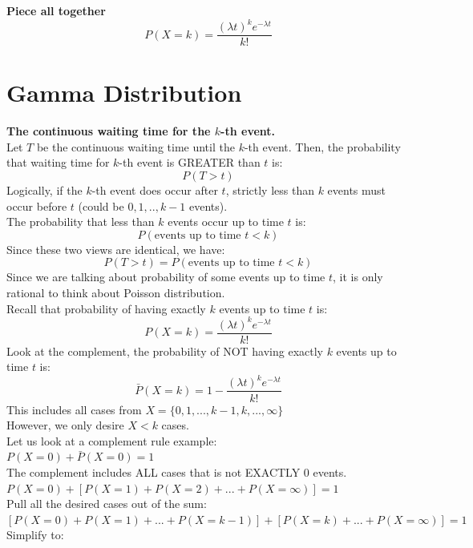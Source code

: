 \documentclass{article}
\begin{document}
\textbf{Piece all together} \\
$$P(X=k) = \dfrac{(\lambda t)^k e^{-\lambda t}}{k!}$$

\newpage
\maketitle

\section{Gamma Distribution}
\textbf{The continuous waiting time for the $k$-th event.} \\

Let $T$ be the continuous waiting time until the $k$-th event. Then, the probability that waiting time for $k$-th event is GREATER than $t$ is:\\
$$P(T>t)$$ 
Logically, if the $k$-th event does occur after $t$, strictly less than $k$ events must occur before $t$ (could be $0, 1,.., k-1$ events). \\
The probability that less than $k$ events occur up to time $t$ is: \\
$$P(\text{events up to time } t<k)$$ 
Since these two views are identical, we have: \\
$$P(T>t) = P(\text{events up to time } t<k)$$
Since we are talking about probability of some events up to time $t$, it is only rational to think about Poisson distribution.  \\
Recall that probability of having exactly $k$ events up to time $t$ is:
$$P(X=k) = \dfrac{(\lambda t)^k e^{-\lambda t}}{k!}$$
Look at the complement, the probability of NOT having exactly $k$ events up to time $t$ is:  
$$\bar{P}(X=k) = 1- \dfrac{(\lambda t)^k e^{-\lambda t}}{k!}$$
This includes all cases from $X = \{0,1,...,k-1,k,...,\infty\}$ \\
However, we only desire $X<k$ cases. \\
Let us look at a complement rule example: \\
$P(X=0) + \bar{P}(X=0)  = 1$ \\
The complement includes ALL cases that is not EXACTLY 0 events. \\
$P(X=0) + [P(X=1) + P(X=2) + ...+P(X=\infty)] = 1 $\\
Pull all the desired cases out of the sum: \\
$[P(X=0) + P(X=1) +...+ P(X=k-1)] +[P(X=k)+ ...+P(X=\infty)] = 1$\\
Simplify to: \\
\end{document}
